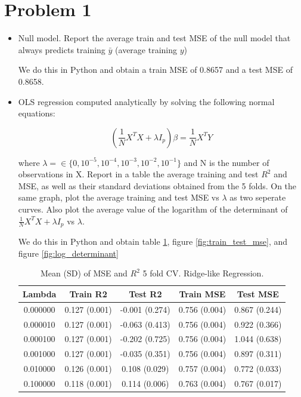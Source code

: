 \documentclass[12pt]{article}
\begin{document}
\section*{Problem 1}
\begin{itemize}
    \item Null model.  Report the average train and test MSE of the null model that always predicts training 
    \(\bar{y}\) (average training \(y\))

    We do this in Python and obtain a train MSE of 0.8657 and a test MSE of 0.8658. 

    \item OLS regression computed analytically by solving the following normal equations:
    
    \[(\frac{1}{N}X^T X + \lambda I_p)\beta = \frac{1}{N}X^T Y\]

    where \(\lambda = \in \{0,10^{-5}, 10^{-4}, 10^{-3}, 10^{-2}, 10^{-1}\}\) and N is the number of observations
    in X.  Report in a table the average training and test \(R^2\) and MSE, as well as their standard 
    deviations obtained from the 5 folds.  On the same graph, plot the average training and test MSE vs \(\lambda\)
    as two seperate curves.  Also plot the average value of the logarithm of the determinant of 
    \(\frac{1}{N}X^T X + \lambda I_p\) vs \(\lambda\).

    We do this in Python and obtain table \ref{tab:ridge_mean_sd}, figure \ref{fig:train_test_mse}, and figure \ref{fig:log_determinant}

    \begin{table}[htbp]
        \centering
        \begin{tabular}{ccccc}
            \toprule
            Lambda & Train R2 & Test R2 & Train MSE & Test MSE \\
            \midrule
            0.000000 & 0.127 (0.001) & -0.001 (0.274) & 0.756 (0.004) & 0.867 (0.244) \\
            0.000010 & 0.127 (0.001) & -0.063 (0.413) & 0.756 (0.004) & 0.922 (0.366) \\
            0.000100 & 0.127 (0.001) & -0.202 (0.725) & 0.756 (0.004) & 1.044 (0.638) \\
            0.001000 & 0.127 (0.001) & -0.035 (0.351) & 0.756 (0.004) & 0.897 (0.311) \\
            0.010000 & 0.126 (0.001) & 0.108 (0.029) & 0.757 (0.004) & 0.772 (0.033) \\
            0.100000 & 0.118 (0.001) & 0.114 (0.006) & 0.763 (0.004) & 0.767 (0.017) \\
            \bottomrule
        \end{tabular}
        \caption{Mean (SD) of MSE and $R^2$ 5 fold CV.  Ridge-like Regression.}
        \label{tab:ridge_mean_sd}
    \end{table}


\end{itemize}
\end{document}
